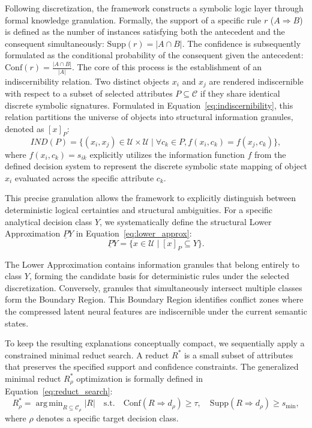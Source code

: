 \documentclass[make,article,submit,pdftex,moreauthors]{Definitions/mdpi}
\newcommand{\U}{\mathcal{U}}
\newcommand{\C}{\mathcal{C}}
\DeclareMathOperator*{\argmin}{arg\,min}
\begin{document}
Following discretization, the framework constructs a symbolic logic layer through formal knowledge granulation. Formally, the support of a specific rule $r$ ($A \Rightarrow B$) is defined as the number of instances satisfying both the antecedent and the consequent simultaneously: $\mathrm{Supp}(r) = |A \cap B|$. The confidence is subsequently formulated as the conditional probability of the consequent given the antecedent: $\mathrm{Conf}(r) = \frac{|A \cap B|}{|A|}$. The core of this process is the establishment of an indiscernibility relation. Two distinct objects $x_i$ and $x_j$ are rendered indiscernible with respect to a subset of selected attributes $P \subseteq \C$ if they share identical discrete symbolic signatures. Formulated in Equation~\eqref{eq:indiscernibility}, this relation partitions the universe of objects into structural information granules, denoted as $[x]_P$:
\begin{equation}
 \label{eq:indiscernibility}
 IND(P) = \{(x_i, x_j) \in \U \times \U \mid \forall c_k \in P, f(x_i, c_k) = f(x_j, c_k)\},
\end{equation}
where $f(x_i, c_k) = s_{ik}$ explicitly utilizes the information function $f$ from the defined decision system to represent the discrete symbolic state mapping of object $x_i$ evaluated across the specific attribute $c_k$.

This precise granulation allows the framework to explicitly distinguish between deterministic logical certainties and structural ambiguities. For a specific analytical decision class $Y$, we systematically define the structural Lower Approximation $\underline{P}Y$ in Equation~\eqref{eq:lower_approx}:
\begin{equation}
 \label{eq:lower_approx}
 \underline{P}Y = \{x \in \U \mid [x]_P \subseteq Y\}.
\end{equation}

The Lower Approximation contains information granules that belong entirely to class $Y$, forming the candidate basis for deterministic rules under the selected discretization. Conversely, granules that simultaneously intersect multiple classes form the Boundary Region. This Boundary Region identifies conflict zones where the compressed latent neural features are indiscernible under the current semantic states.

To keep the resulting explanations conceptually compact, we sequentially apply a constrained minimal reduct search. A reduct $R^{\ast}$ is a small subset of attributes that preserves the specified support and confidence constraints. The generalized minimal reduct $R_{\rho}^{\ast}$ optimization is formally defined in Equation~\eqref{eq:reduct_search}:
\begin{equation}
 \label{eq:reduct_search}
 R_{\rho}^{\ast} = \argmin_{R \subseteq \C_{\rho}} |R| \quad \mathrm{s.t.}\quad \mathrm{Conf}(R \Rightarrow d_{\rho}) \geq \tau,\quad \mathrm{Supp}(R \Rightarrow d_{\rho}) \geq s_{\min},
\end{equation}
where $\rho$ denotes a specific target decision class.
\end{document}
